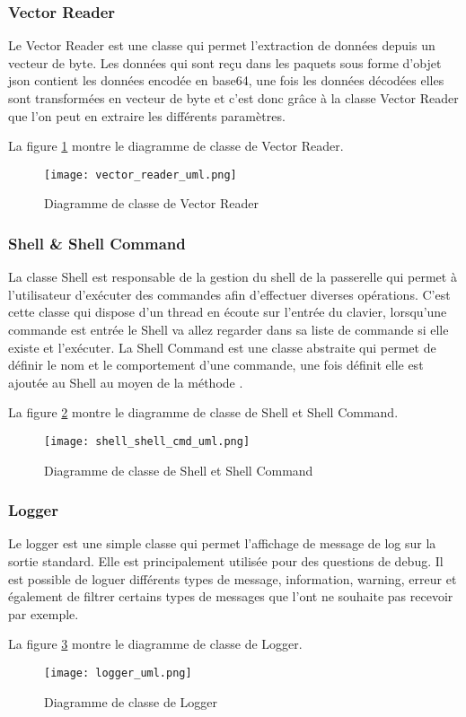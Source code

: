 \subsubsection{Vector Reader}

Le Vector Reader est une classe qui permet l'extraction de données depuis un vecteur de byte. Les données qui sont reçu dans les paquets sous forme d'objet json contient les données encodée en base64, une fois les données décodées elles sont transformées en vecteur de byte et c'est donc grâce à la classe Vector Reader que l'on peut en extraire les différents paramètres.

La figure \ref{fig:vector_reader_uml} montre le diagramme de classe de Vector Reader.

\begin{figure}[htb]
\centering 
\texttt{[image: vector\_reader\_uml.png]} 
\caption{Diagramme de classe de Vector Reader}
\label{fig:vector_reader_uml}
 \end{figure}

\subsubsection{Shell \& Shell Command}

La classe Shell est responsable de la gestion du shell de la passerelle qui permet à l'utilisateur d'exécuter des commandes afin d'effectuer diverses opérations. C'est cette classe qui dispose d'un thread en écoute sur l'entrée du clavier, lorsqu'une commande est entrée le Shell va allez regarder dans sa liste de commande si elle existe et l'exécuter.
La Shell Command est une classe abstraite qui permet de définir le nom et le comportement d'une commande, une fois définit elle est ajoutée au Shell au moyen de la méthode .

La figure \ref{fig:shell_shell_cmd_uml} montre le diagramme de classe de Shell et Shell Command.

\begin{figure}[htb]
\centering 
\texttt{[image: shell\_shell\_cmd\_uml.png]} 
\caption{Diagramme de classe de Shell et Shell Command}
\label{fig:shell_shell_cmd_uml}
 \end{figure}

\subsubsection{Logger}

Le logger est une simple classe qui permet l'affichage de message de log sur la sortie standard. Elle est principalement utilisée pour des questions de debug. Il est possible de loguer différents types de message, information, warning, erreur et également de filtrer certains types de messages que l'ont ne souhaite pas recevoir par exemple.

La figure \ref{fig:logger_uml} montre le diagramme de classe de Logger.

\begin{figure}[htb]
\centering 
\texttt{[image: logger\_uml.png]} 
\caption{Diagramme de classe de Logger}
\label{fig:logger_uml}
 \end{figure}

